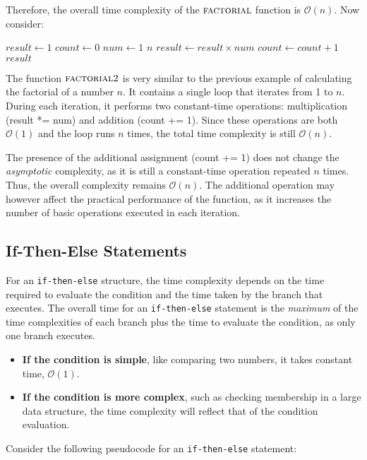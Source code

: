 Therefore, the overall time complexity of the $\proc{factorial}$ function is $\mathcal{O}(n)$. Now consider:

\begin{codebox}
    \li $result \gets 1$
    \li $count \gets 0$
    \li \For $num \gets 1$ \To $n$ \Do
    \li     $result \gets result \times num$
    \li     $count \gets count + 1$
        \End
    \li \Return $result$
\end{codebox}

The function $\proc{factorial2}$ is very similar to the previous example of calculating the factorial of a number \( n \). It contains a single loop that iterates from 1 to \( n \). During each iteration, it performs two constant-time operations: multiplication (result *= num) and addition (count += 1). Since these operations are both \(\mathcal{O}(1)\) and the loop runs \( n \) times, the total time complexity is still \(\mathcal{O}(n)\).

The presence of the additional assignment (count += 1) does not change the \textit{asymptotic} complexity, as it is still a constant-time operation repeated \( n \) times. Thus, the overall complexity remains \(\mathcal{O}(n)\). The additional  operation may however affect the practical performance of the function, as it increases the number of basic operations executed in each iteration.

\subsection*{If-Then-Else Statements}
For an \texttt{if-then-else} structure, the time complexity depends on the time required to evaluate the condition and the time taken by the branch that executes. The overall time for an \texttt{if-then-else} statement is the \textit{maximum} of the time complexities of each branch plus the time to evaluate the condition, as only one branch executes.

\begin{itemize}
    \item \textbf{If the condition is simple}, like comparing two numbers, it takes constant time, $\mathcal{O}(1)$.
    \item \textbf{If the condition is more complex}, such as checking membership in a large data structure, the time complexity will reflect that of the condition evaluation.
\end{itemize}

Consider the following pseudocode for an \texttt{if-then-else} statement:

